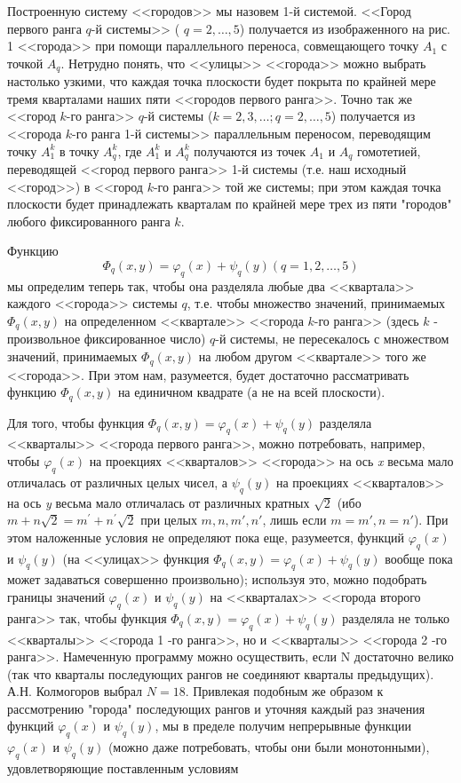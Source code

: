 \documentclass[12pt, twoside]{article}
\theoremstyle{definition}
\begin{document}
Построенную систему <<городов>> мы назовем 1-й системой. <<Город первого ранга $q$-й системы>> ( $q=2,\dots,5$) получается из изображенного на рис. 1 <<города>> при помощи параллельного переноса, совмещающего точку $A_1$ с точкой $A_q$. Нетрудно понять, что <<улицы>> <<города>> можно выбрать настолько узкими, что каждая точка плоскости будет покрыта по крайней мере тремя кварталами наших пяти <<городов первого ранга>>. Точно так же <<город $k$-го ранга>> $q$-й системы ($k=2,3,\dots;q=2,\dots,5$) получается из <<города $k$-го ранга 1-й системы>> параллельным переносом, переводящим точку $A_1^k$ в точку $A_q^k$, где $A_1^k$ и $A_q^k$ получаются из точек $A_1$ и $A_q$ гомотетией, переводящей <<город первого ранга>> 1-й системы (т.е. наш исходный <<город>>) в <<город $k$-го ранга>> той же системы; при этом каждая точка плоскости будет принадлежать кварталам по крайней мере трех из пяти "городов" любого фиксированного ранга  $k$.

Функцию 
\begin{equation}\label{eq13}
\Phi_{q}(x,y) = \varphi_{q}(x)+\psi_{q}(y) (q=1,2,\dots,5)
\end{equation}
мы определим теперь так, чтобы она разделяла любые два <<квартала>> каждого <<города>> системы $q$, т.е. чтобы множество значений, принимаемых $\Phi_{q}(x,y)$ на определенном <<квартале>> <<города $k$-го ранга>> (здесь $k$ - произвольное фиксированное число) $q$-й системы, не пересекалось с множеством значений, принимаемых $\Phi_{q}(x,y)$ на любом другом <<квартале>> того же <<города>>. При этом нам, разумеется, будет достаточно рассматривать функцию $\Phi_{q}(x,y)$ на единичном квадрате (а не на всей плоскости).

Для того, чтобы функция $\Phi_{q}(x,y) = \varphi_{q}(x)+\psi_{q}(y)$ разделяла <<кварталы>> <<города первого ранга>>, можно потребовать, например, чтобы $\varphi_{q}(x)$ на проекциях <<кварталов>> <<города>> на ось \textit{x} весьма мало отличалась от различных целых чисел, а $\psi_{q}(y)$ на проекциях <<кварталов>> на ось \textit{y} весьма мало отличалась от различных кратных $\sqrt2$ (ибо $m+n\sqrt2 =m^{'}+n^{'}\sqrt2$ при целых $m, n, m', n'$, лишь если $m=m',n=n'$). При этом наложенные условия не определяют пока еще, разумеется, функций $\varphi_{q}(x)$ и $\psi_{q}(y)$ (на <<улицах>> функция $\Phi_{q}(x,y) = \varphi_{q}(x)+\psi_{q}(y)$ вообще пока может задаваться совершенно произвольно); используя это, можно подобрать границы значений $\varphi_{q}(x)$ и $\psi_{q}(y)$ на <<кварталах>> <<города второго ранга>> так, чтобы функция $\Phi_{q}(x,y) = \varphi_{q}(x)+\psi_{q}(y)$ разделяла не только <<кварталы>> <<города 1 -го ранга>>, но и <<кварталы>> <<города 2 -го ранга>>. Намеченную программу можно осуществить, если N достаточно велико (так что кварталы последующих рангов не соединяют кварталы предыдущих). А.Н. Колмогоров выбрал $N=18$. Привлекая подобным же образом к рассмотрению "города" последующих рангов и уточняя каждый раз значения функций $\varphi_{q}(x)$ и $\psi_{q}(y)$, мы в пределе получим непрерывные функции $\varphi_{q}(x)$ и $\psi_{q}(y)$ (можно даже потребовать, чтобы они были монотонными), удовлетворяющие поставленным условиям
\end{document}
